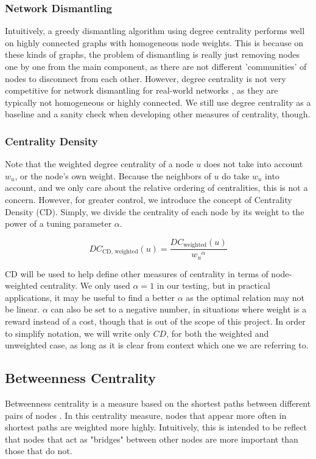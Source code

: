 \documentclass{article}
\begin{document}
\subsubsection{Network Dismantling}
Intuitively, a greedy dismantling algorithm using degree centrality performs well on highly connected graphs with homogeneous node weights. This is because on these kinds of graphs, the problem of dismantling is really just removing nodes one by one from the main component, as there are not different 'communities' of nodes to disconnect from each other. However, degree centrality is not very competitive for network dismantling for real-world networks \cite{analysis}, as they are typically not homogeneous or highly connected. 
We still use degree centrality as a baseline and a sanity check when developing other measures of centrality, though.

\subsubsection{Centrality Density}
Note that the weighted degree centrality of a node $u$ does not take into account $w_u$, or the node's own weight. Because the neighbors of $u$ do take $w_u$ into account, and we only care about the relative ordering of centralities, this is not a concern. However, for greater control, we introduce the concept of Centrality Density (CD). Simply, we divide the centrality of each node by its weight to the power of a tuning parameter $\alpha$.

$$DC_{\text{CD, weighted}}(u) = \frac{DC_{\text{weighted}}(u)}{{w_u}^\alpha}$$

CD will be used to help define other measures of centrality in terms of node-weighted centrality. We only used $\alpha=1$ in our testing, but in practical applications, it may be useful to find a better $\alpha$ as the optimal relation may not be linear. $\alpha$ can also be set to a negative number, in situations where weight is a reward instead of a cost, though that is out of the scope of this project.
In order to simplify notation, we will write only $CD$, for both the weighted and unweighted case, as long as it is clear from context which one we are referring to.

\subsection{Betweenness Centrality}
Betweenness centrality is a measure based on the shortest paths between different pairs of nodes \cite{BRANDES2008136}.
In this centrality measure, nodes that appear more often in shortest paths are weighted more highly.
Intuitively, this is intended to be reflect that nodes that act as "bridges" between other nodes are more important than those that do not.
\end{document}
